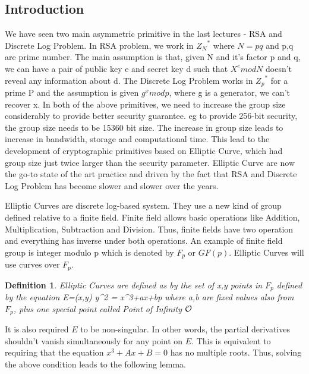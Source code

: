 

\subsection{Introduction}

We have seen two main asymmetric primitive in the last lectures - RSA and Discrete Log Problem. In RSA problem, we work in ${Z_N}^*$ where $N=pq$ and p,q are prime number. The main assumption is that, given N and it's factor p and q, we can have a pair of public key e and secret key d such that $X^e mod N$ doesn't reveal any information about d. The Discrete Log Problem works in ${Z_p}^*$ for a prime P and the assumption is given $g^x mod p$, where g is a generator, we can't recover x. In both of the above primitives, we need to increase the group size considerably to provide better security guarantee. eg to provide 256-bit security, the group size needs to be 15360 bit size. The increase in group size leads to increase in  bandwidth, storage and computational time. This lead to the development of cryptographic primitives based on Elliptic Curve, which had group size just twice larger than the security parameter. Elliptic Curve are now the go-to state of the art practice and driven by the fact that RSA and Discrete Log Problem has become slower and slower over the years.

Elliptic Curves are discrete log-based system. They use a new kind of group defined relative to a finite field. Finite field allows basic operations like Addition, Multiplication, Subtraction and Division. Thus, finite fields have two operation and everything has inverse under both operations. An example of finite field group is integer modulo p which is denoted by $F_p$ or $GF(p)$. Elliptic Curves will use curves over $F_p$. 

\newtheorem{df}{Definition}
\begin{df}
Elliptic Curves are defined as by the set of x,y points in $F_p$ defined by the equation 
\bnm
E={(x,y) \mid y^2 = x^3+ax+b\mod p}
\enm 
where a,b are fixed values also from $F_p$, plus one special point called Point of Infinity $\cal O$
\end{df}

It is also required $E$ to be non-singular. In other words,
the partial derivatives shouldn't vanish simultaneously for any point
on $E$. This is equivalent to requiring that the
equation $x^{3}+Ax+B=0$ has no multiple roots. Thus, solving the above condition leads to the following lemma.

